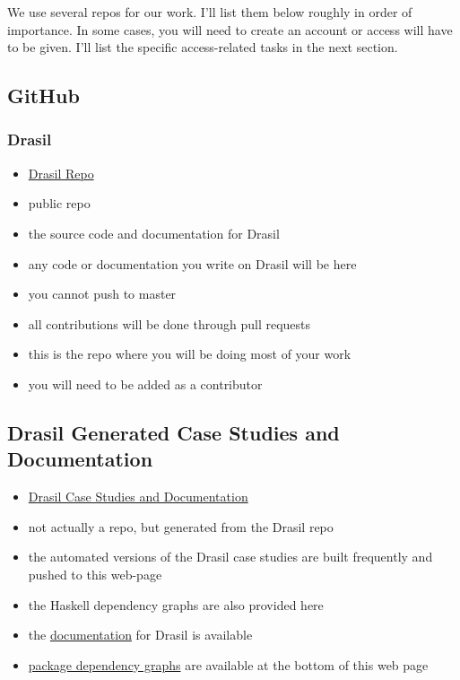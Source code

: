\documentclass[12pt]{article}
\begin{document}
We use several repos for our work.  I'll list them below roughly in order of
importance.  In some cases, you will need to create an account or access will
have to be given.  I'll list the specific access-related tasks in the next
section.

\subsection{GitHub}

\subsubsection{Drasil}
\begin{itemize}
\item \href{https://github.com/JacquesCarette/Drasil} {Drasil Repo}
\item public repo
\item the source code and documentation for Drasil
\item any code or documentation you write on Drasil will be here
\item you cannot push to master
\item all contributions will be done through pull requests
\item this is the repo where you will be doing most of your work
\item you will need to be added as a contributor
\end{itemize}

\subsection{Drasil Generated Case Studies and Documentation}
\begin{itemize}
\item \href{https://jacquescarette.github.io/Drasil/} {Drasil Case Studies and Documentation}
\item not actually a repo, but generated from the Drasil repo
\item the automated versions of the Drasil case studies are built frequently and pushed to this web-page
\item the Haskell dependency graphs are also provided here
\item the \href{https://jacquescarette.github.io/Drasil/docs/index.html}
{documentation} for Drasil is available
\item \href{https://jacquescarette.github.io/Drasil/} {package dependency
graphs} are available at the bottom of this web page
\end{itemize}
\end{document}
